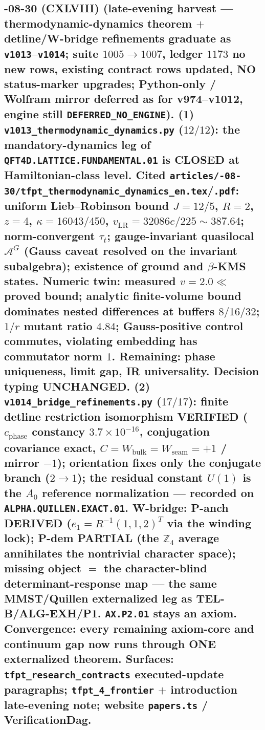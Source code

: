 \subsection*{-08-30 (CXLVIII) (late-evening harvest --- thermodynamic-dynamics theorem $+$ detline/W-bridge refinements graduate as \texttt{v1013}--\texttt{v1014}; suite $1005 \to 1007$, ledger $1173$ no new rows, existing contract rows updated, NO status-marker upgrades; Python-only / Wolfram mirror deferred as for v974--v1012, engine still \texttt{DEFERRED\_NO\_ENGINE}).  \textbf{(1)} \texttt{v1013\_\allowbreak thermodynamic\_\allowbreak dynamics.py} ($12/12$): the mandatory-dynamics leg of \texttt{QFT4D.LATTICE.FUNDAMENTAL.01} is CLOSED at Hamiltonian-class level.  Cited \texttt{articles/-08-30/\allowbreak tfpt\_\allowbreak thermodynamic\_\allowbreak dynamics\_\allowbreak en.tex}/\texttt{.pdf}: uniform Lieb--Robinson bound $J=12/5$, $R=2$, $z=4$, $\kappa=16043/450$, $v_{\mathrm{LR}}=32086e/225\sim387.64$; norm-convergent $\tau_t$; gauge-invariant quasilocal $\mathcal A^G$ (Gauss caveat resolved on the invariant subalgebra); existence of ground and $\beta$-KMS states.  Numeric twin: measured $v=2.0\ll$ proved bound; analytic finite-volume bound dominates nested differences at buffers $8/16/32$; $1/r$ mutant ratio $4.84$; Gauss-positive control commutes, violating embedding has commutator norm $1$.  Remaining: phase uniqueness, limit gap, IR universality.  Decision typing UNCHANGED.  \textbf{(2)} \texttt{v1014\_\allowbreak bridge\_\allowbreak refinements.py} ($17/17$): finite detline restriction isomorphism VERIFIED ($c_{\mathrm{phase}}$ constancy $3.7{\times}10^{-16}$, conjugation covariance exact, $C=W_{\mathrm{bulk}}=W_{\mathrm{seam}}=+1$ / mirror $-1$); orientation fixes only the conjugate branch ($2\to1$); the residual constant $U(1)$ is the $A_0$ reference normalization --- recorded on \texttt{ALPHA.QUILLEN.EXACT.01}.  W-bridge: P-anch DERIVED ($e_1=R^{-1}(1,1,2)^T$ via the winding lock); P-dem PARTIAL (the $\mathbb Z_4$ average annihilates the nontrivial character space); missing object $=$ the character-blind determinant-response map --- the same MMST/Quillen externalized leg as TEL-B/ALG-EXH/P1.  \texttt{AX.P2.01} stays an axiom.  Convergence: every remaining axiom-core and continuum gap now runs through ONE externalized theorem.  Surfaces: \texttt{tfpt\_research\_contracts} executed-update paragraphs; \texttt{tfpt\_4\_frontier} $+$ introduction late-evening note; website \texttt{papers.ts} / VerificationDag.}

